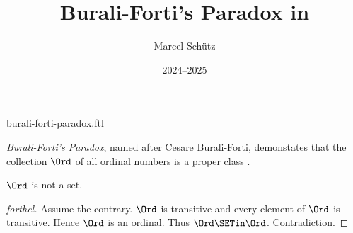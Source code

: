 \documentclass{article}
\title{Burali-Forti's Paradox in \Naproche}
\author{Marcel Schütz}
\date{2024--2025}
\begin{document}
\begin{smodule}{burali-forti-paradox.ftl}
\maketitle


\noindent \emph{Burali-Forti's Paradox}, named after Cesare Burali-Forti, 
demonstates that the collection $\Ord$ of all ordinal numbers is a
proper class \cite{BuraliForti1897}.

\begin{theorem}[forthel,title=Burali-Forti's Paradox,id=burali_forti_paradox]
  $\Ord$ is not a set.
\end{theorem}
\begin{proof}[forthel]
  Assume the contrary.
  $\Ord$ is transitive and every element of $\Ord$ is transitive.
  Hence $\Ord$ is an ordinal.
  Thus $\Ord \SETin \Ord$.
  Contradiction.
\end{proof}

\printbibliography
{}
\end{smodule}
\end{document}
